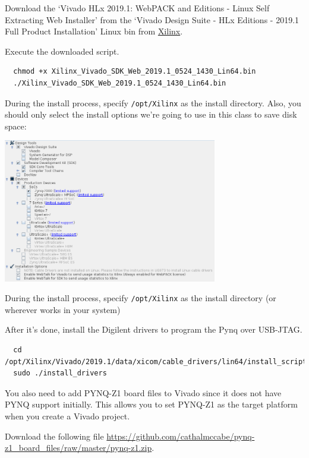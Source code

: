 \documentclass[11pt]{article}
\begin{document}
Download the `Vivado HLx 2019.1: WebPACK and Editions - Linux Self Extracting Web Installer' from the `Vivado Design Suite - HLx Editions - 2019.1  Full Product Installation' Linux bin from \href{https://www.xilinx.com/support/download/index.html/content/xilinx/en/downloadNav/vivado-design-tools/archive.html}{Xilinx}.

Execute the downloaded script.

\begin{verbatim}
  chmod +x Xilinx_Vivado_SDK_Web_2019.1_0524_1430_Lin64.bin
  ./Xilinx_Vivado_SDK_Web_2019.1_0524_1430_Lin64.bin
\end{verbatim}

During the install process, specify \texttt{/opt/Xilinx} as the install directory.
Also, you should only select the install options we're going to use in this class to save disk space:

\begin{center}
\includegraphics[width=0.7\textwidth]{figs/vivado_install_options.png}
\end{center}

During the install process, specify \texttt{/opt/Xilinx} as the install directory (or wherever works in your system)

After it's done, install the Digilent drivers to program the Pynq over USB-JTAG.
\begin{verbatim}
  cd /opt/Xilinx/Vivado/2019.1/data/xicom/cable_drivers/lin64/install_script/install_drivers
  sudo ./install_drivers
\end{verbatim}

You also need to add PYNQ-Z1 board files to Vivado since it does not have PYNQ support initially.
This allows you to set PYNQ-Z1 as the target platform when you create a Vivado project.

Download the following file \url{https://github.com/cathalmccabe/pynq-z1_board_files/raw/master/pynq-z1.zip}.
\end{document}
